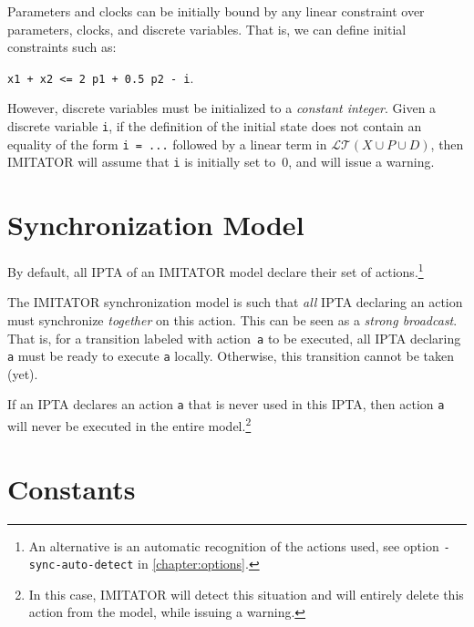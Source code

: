 \documentclass[a4paper,11pt]{report}
\newcommand{\Clock}{X} %
\newcommand{\DVar}{D} %
\newcommand{\LTerm}{\mathcal{LT}} %
\newcommand{\LTermXPD}{\LTerm(\Clock \cup \Param \cup \DVar)}
\newcommand{\Param}{P} %
\newcommand{\imitator}{\textsf{IMITATOR}}
\newcommand{\IPTA}{IPTA}
\newcommand{\styleIMI}[1]{\textcolor{imicolor}{\texttt{#1}}}
\newcommand{\styleOption}[1]{\textcolor{optioncolor}{\texttt{#1}}}
\begin{document}
Parameters and clocks can be initially bound by any linear constraint over parameters, clocks, and discrete variables.
That is, we can define initial constraints such as:
\begin{center}
	\styleIMI{x1 + x2 <= 2 p1 + 0.5 p2 - i}.
\end{center}

However, discrete variables must be initialized to a \emph{constant integer}.
Given a discrete variable \styleIMI{i}, if the definition of the initial state does not contain an equality of the form \styleIMI{i = ...} followed by a linear term in $\LTermXPD$, then \imitator{} will assume that \styleIMI{i} is initially set to~0, and will issue a warning.



\section{Synchronization Model}\label{sect:synchronization}

By default, all \IPTA{} of an \imitator{} model declare their set of actions.\footnote{%
	An alternative is an automatic recognition of the actions used, see option \styleOption{-sync-auto-detect} in \cref{chapter:options}.
}

The \imitator{} synchronization model is such that \emph{all} \IPTA{} declaring an action must synchronize \emph{together} on this action.
This can be seen as a \emph{strong broadcast}.
That is, for a transition labeled with action~\styleIMI{a} to be executed, all \IPTA{} declaring \styleIMI{a} must be ready to execute \styleIMI{a} locally.
Otherwise, this transition cannot be taken (yet).

If an \IPTA{} declares an action \styleIMI{a} that is never used in this \IPTA{}, then action \styleIMI{a} will never be executed in the entire model.\footnote{%
	In this case, \imitator{} will detect this situation and will entirely delete this action from the model, while issuing a warning.
}

\section{Constants}
\end{document}
